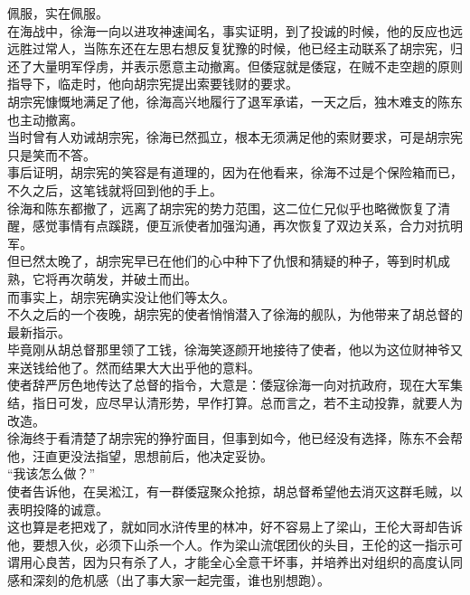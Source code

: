 \begin{multicols}{\theparacolNo}
佩服，实在佩服。\\

在海战中，徐海一向以进攻神速闻名，事实证明，到了投诚的时候，他的反应也远远胜过常人，当陈东还在左思右想反复犹豫的时候，他已经主动联系了胡宗宪，归还了大量明军俘虏，并表示愿意主动撤离。但倭寇就是倭寇，在贼不走空趟的原则指导下，临走时，他向胡宗宪提出索要钱财的要求。\\

胡宗宪慷慨地满足了他，徐海高兴地履行了退军承诺，一天之后，独木难支的陈东也主动撤离。\\

当时曾有人劝诫胡宗宪，徐海已然孤立，根本无须满足他的索财要求，可是胡宗宪只是笑而不答。\\

事后证明，胡宗宪的笑容是有道理的，因为在他看来，徐海不过是个保险箱而已，不久之后，这笔钱就将回到他的手上。\\

徐海和陈东都撤了，远离了胡宗宪的势力范围，这二位仁兄似乎也略微恢复了清醒，感觉事情有点蹊跷，便互派使者加强沟通，再次恢复了双边关系，合力对抗明军。\\

但已然太晚了，胡宗宪早已在他们的心中种下了仇恨和猜疑的种子，等到时机成熟，它将再次萌发，并破土而出。\\

而事实上，胡宗宪确实没让他们等太久。\\

不久之后的一个夜晚，胡宗宪的使者悄悄潜入了徐海的舰队，为他带来了胡总督的最新指示。\\

毕竟刚从胡总督那里领了工钱，徐海笑逐颜开地接待了使者，他以为这位财神爷又来送钱给他了。然而结果大大出乎他的意料。\\

使者辞严厉色地传达了总督的指令，大意是：倭寇徐海一向对抗政府，现在大军集结，指日可发，应尽早认清形势，早作打算。总而言之，若不主动投靠，就要人为改造。\\

徐海终于看清楚了胡宗宪的狰狞面目，但事到如今，他已经没有选择，陈东不会帮他，汪直更没法指望，思想前后，他决定妥协。\\

“我该怎么做？”\\

使者告诉他，在吴淞江，有一群倭寇聚众抢掠，胡总督希望他去消灭这群毛贼，以表明投降的诚意。\\

这也算是老把戏了，就如同水浒传里的林冲，好不容易上了梁山，王伦大哥却告诉他，要想入伙，必须下山杀一个人。作为梁山流氓团伙的头目，王伦的这一指示可谓用心良苦，因为只有杀了人，才能全心全意干坏事，并培养出对组织的高度认同感和深刻的危机感（出了事大家一起完蛋，谁也别想跑）。\\


\end{multicols}
